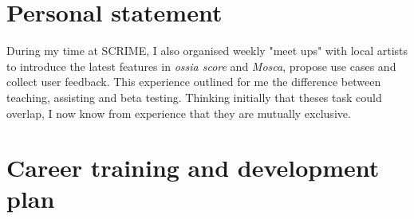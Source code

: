 \documentclass[journal,onecolumn]{IEEEtran}
\begin{document}
\section{Personal statement} %
During my time at SCRIME, I also organised weekly "meet ups" with local artists to introduce the latest features in \textit{ossia score} and \textit{Mosca}, propose use cases and collect user feedback. This experience outlined for me the difference between teaching, assisting and beta testing. Thinking initially that theses task could overlap, I now know from experience that they are mutually exclusive.

\section{Career training and development plan} %

%
%
\end{document}
